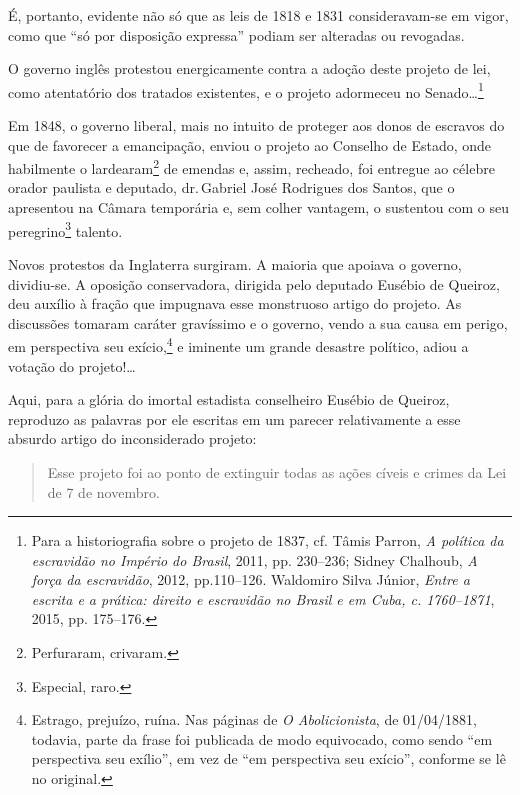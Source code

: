 {É, portanto, evidente não só que as leis de 1818 e 1831 consideravam-se
em vigor, como que ``só por disposição expressa'' podiam ser alteradas ou
revogadas.

O governo inglês protestou energicamente contra a adoção deste projeto
de lei, como atentatório dos tratados existentes, e o projeto adormeceu
no Senado\ldots{}\footnote{Para a historiografia sobre o projeto de 1837,
  cf. Tâmis Parron, \emph{A política da escravidão no Império do
  Brasil}, 2011, pp. 230--236; Sidney Chalhoub, \emph{A força da
  escravidão}, 2012, pp.110--126. Waldomiro Silva Júnior, \emph{Entre a
  escrita e a prática: direito e escravidão no Brasil e em Cuba, c.
  1760--1871}, 2015, pp. 175--176.}

Em 1848, o governo liberal, mais no intuito de proteger aos donos de
escravos do que de favorecer a emancipação, enviou o projeto ao Conselho
de Estado, onde habilmente o lardearam\footnote{Perfuraram, crivaram.}
de emendas e, assim, recheado, foi entregue ao célebre orador paulista e
deputado, dr.\,Gabriel José Rodrigues dos Santos, que o apresentou na
Câmara temporária e, sem colher vantagem, o sustentou com o seu
peregrino\footnote{Especial, raro.} talento.

Novos protestos da Inglaterra surgiram. A maioria que apoiava o governo,
dividiu-se. A oposição conservadora, dirigida pelo deputado Eusébio de
Queiroz, deu auxílio à fração que impugnava esse monstruoso artigo do
projeto. As discussões tomaram caráter gravíssimo e o governo, vendo a
sua causa em perigo, em perspectiva seu exício,\footnote{Estrago,
  prejuízo, ruína. Nas páginas de \emph{O Abolicionista}, de 01/04/1881,
  todavia, parte da frase foi publicada de modo equivocado, como sendo
  ``em perspectiva seu exílio'', em vez de ``em perspectiva seu exício'',
  conforme se lê no original.} e iminente um grande desastre político,
adiou a votação do projeto!\ldots{}

Aqui, para a glória do imortal estadista conselheiro Eusébio de Queiroz,
reproduzo as palavras por ele escritas em um parecer relativamente a
esse absurdo artigo do inconsiderado projeto:

\begin{quote}
Esse projeto foi ao ponto de extinguir todas as ações cíveis e crimes
da Lei de 7 de novembro.


\end{quote}}
